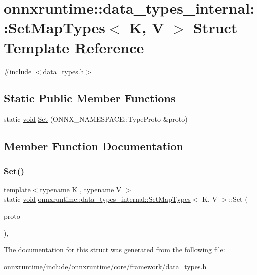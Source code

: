 \hypertarget{structonnxruntime_1_1data__types__internal_1_1SetMapTypes}{}\section{onnxruntime\+:\+:data\+\_\+types\+\_\+internal\+:\+:Set\+Map\+Types$<$ K, V $>$ Struct Template Reference}
\label{structonnxruntime_1_1data__types__internal_1_1SetMapTypes}


{\ttfamily \#include $<$data\+\_\+types.\+h$>$}

\subsection*{Static Public Member Functions}
\begin{DoxyCompactItemize}
\item 
static \mbox{\hyperlink{mlasi_8h_a88f941d423cb2a819b70a1358982b1a6}{void}} \mbox{\hyperlink{structonnxruntime_1_1data__types__internal_1_1SetMapTypes_ae847ce75292f38b5d3c76d7cac15eebf}{Set}} (O\+N\+N\+X\+\_\+\+N\+A\+M\+E\+S\+P\+A\+C\+E\+::\+Type\+Proto \&proto)
\end{DoxyCompactItemize}


\subsection{Member Function Documentation}
\mbox{\label{structonnxruntime_1_1data__types__internal_1_1SetMapTypes_ae847ce75292f38b5d3c76d7cac15eebf}} 
\subsubsection{\texorpdfstring{Set()}{Set()}}
{\footnotesize\ttfamily template$<$typename K , typename V $>$ \\
static \mbox{\hyperlink{mlasi_8h_a88f941d423cb2a819b70a1358982b1a6}{void}} \mbox{\hyperlink{structonnxruntime_1_1data__types__internal_1_1SetMapTypes}{onnxruntime\+::data\+\_\+types\+\_\+internal\+::\+Set\+Map\+Types}}$<$ K, V $>$\+::Set (\begin{DoxyParamCaption}\item[{O\+N\+N\+X\+\_\+\+N\+A\+M\+E\+S\+P\+A\+C\+E\+::\+Type\+Proto \&}]{proto }\end{DoxyParamCaption})\hspace{0.3cm}{\ttfamily [inline]}, {\ttfamily [static]}}



The documentation for this struct was generated from the following file\+:\begin{DoxyCompactItemize}
\item 
onnxruntime/include/onnxruntime/core/framework/\mbox{\hyperlink{data__types_8h}{data\+\_\+types.\+h}}\end{DoxyCompactItemize}

